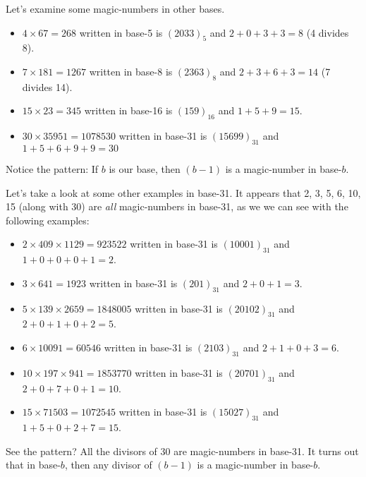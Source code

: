 \documentclass{article}
\begin{document}
Let's examine some magic-numbers
in other bases.
\begin{itemize}
\item $4\times{}67=268$ written in base-5 is $(2033)_5$ and $2+0+3+3=8$ (4 divides 8).
\item $7\times{}181=1267$ written in base-8 is $(2363)_8$ and $2+3+6+3=14$ (7 divides 14).
\item $15\times{}23=345$ written in base-16 is $(159)_{16}$ and $1+5+9=15$.
\item $30\times{}35951=1078530$ written in base-31 is $(15699)_{31}$ and $1+5+6+9+9=30$
\end{itemize}

Notice the pattern:
If $b$ is our base, then $(b-1)$ is a magic-number in base-$b$.

Let's take a look at some other examples in base-31.
It appears that 2, 3, 5, 6, 10, 15 (along with 30)
are \emph{all} magic-numbers in base-31, as we we can see
with the following examples:
\begin{itemize}
\item $2\times{}409\times{}1129=923522$ written in base-31 is $(10001)_{31}$ and $1+0+0+0+1=2$.
\item $3\times{}641=1923$ written in base-31 is $(201)_{31}$ and $2+0+1=3$.
\item $5\times{}139\times{}2659=1848005$ written in base-31 is $(20102)_{31}$ and $2+0+1+0+2=5$.
\item $6\times{}10091=60546$ written in base-31 is $(2103)_{31}$ and $2+1+0+3=6$.
\item $10\times{}197\times{}941=1853770$ written in base-31 is $(20701)_{31}$ and $2+0+7+0+1=10$.
\item $15\times{}71503=1072545$ written in base-31 is $(15027)_{31}$ and $1+5+0+2+7=15$.
\end{itemize}

See the pattern? All the divisors of 30 are magic-numbers in base-31.
It turns out that in base-$b$, then any divisor of $(b-1)$ is a magic-number in base-$b$.
\end{document}
